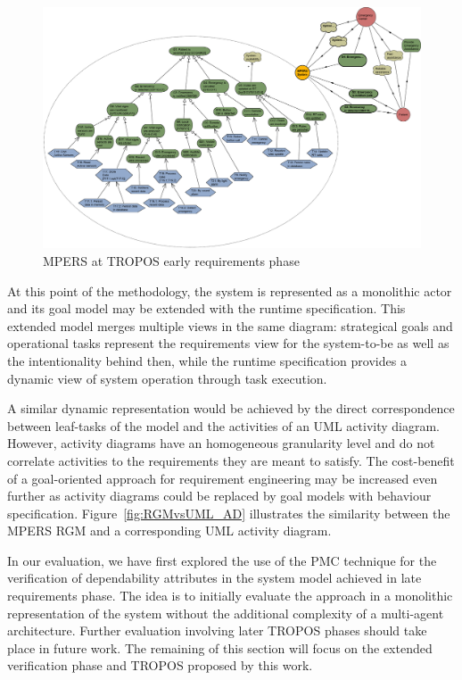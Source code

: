 \begin{figure}[h!]
\centering
\includegraphics[width=1\textwidth]{imgs/MPERS_LR.png}
\caption{MPERS at TROPOS early requirements phase}
\label{fig:MPERS_LR}
\end{figure}

At this point of the methodology, the system is represented as a monolithic actor and its goal model may be extended with the runtime specification. This extended model merges multiple views in the same diagram: strategical goals and operational tasks represent the requirements view for the system-to-be as well as the intentionality behind then, while the runtime specification provides a dynamic view of system operation through task execution.

A similar dynamic representation would be achieved by the direct correspondence between leaf-tasks of the model and the activities of an UML activity diagram. However, activity diagrams have an homogeneous granularity level and do not correlate activities to the requirements they are meant to satisfy. The cost-benefit of a goal-oriented approach for requirement engineering may be increased even further as activity diagrams could be replaced by goal models with behaviour specification. Figure~\ref{fig:RGMvsUML_AD} illustrates the similarity between the MPERS RGM and a corresponding UML activity diagram. 

In our evaluation, we have first explored the use of the PMC technique for the verification of dependability attributes in the system model achieved in late requirements phase. The idea is to initially evaluate the approach in a monolithic representation of the system without the additional complexity of a multi-agent architecture. Further evaluation involving later TROPOS phases should take place in future work. The remaining of this section will focus on the extended verification phase and TROPOS proposed by this work.

